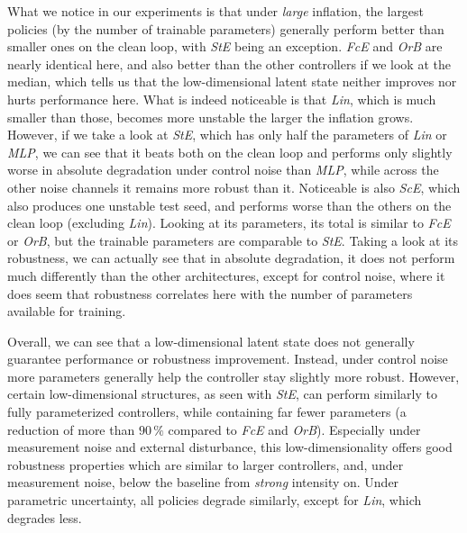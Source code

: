 What we notice in our experiments is that under \emph{large} inflation, the largest policies (by the number of trainable parameters)
generally perform better than smaller ones on the clean loop, with \emph{StE} being an exception.
\emph{FcE} and \emph{OrB} are nearly identical here, and also better than the other controllers if we look at the median,
which tells us that the low-dimensional latent state neither improves nor hurts performance here. What is indeed noticeable
is that \emph{Lin}, which is much smaller than those, becomes more unstable the larger the inflation grows. However,
if we take a look at \emph{StE}, which has only half the parameters of \emph{Lin} or \emph{MLP}, we can see that it beats both on the
clean loop and performs only slightly worse in absolute degradation under control noise than \emph{MLP}, while across the other noise channels
it remains more robust than it. Noticeable is also \emph{ScE}, which also produces one unstable test seed, and performs worse than
the others on the clean loop (excluding \emph{Lin}).
Looking at its parameters, its total is similar to \emph{FcE} or \emph{OrB}, but the trainable parameters are comparable to \emph{StE}. Taking a
look at its robustness, we can actually see that in absolute degradation, it does not perform much differently than the other
architectures, except for control noise, where it does seem that robustness correlates here with the number of parameters
available for training.

Overall, we can see that a low-dimensional latent state does not generally guarantee performance or robustness improvement. Instead,
under control noise more parameters generally help the controller stay slightly more robust. However, certain low-dimensional structures,
as seen with \emph{StE}, can perform similarly to fully parameterized controllers, while
containing far fewer parameters (a reduction of more than $90\,\%$ compared to \emph{FcE} and \emph{OrB}).
Especially under measurement noise and external disturbance, this low-dimensionality offers good robustness properties which are similar to
larger controllers, and, under measurement noise, below the baseline from \emph{strong} intensity on.
Under parametric uncertainty, all policies degrade similarly, except for \emph{Lin}, which degrades less.

